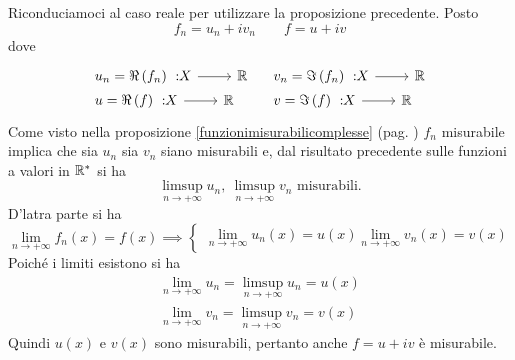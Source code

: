 \begin{demonstration}
	Riconduciamoci al caso reale per utilizzare la proposizione precedente. Posto
	\begin{equation*}
		f_n=u_n+iv_n\qquad f=u+iv
	\end{equation*}
dove
\begin{equation*}
	\begin{array}{ll}
		\funz{u_n=\Re\left(f_n\right)}{X}{\realset}&\funz{v_n=\Im\left(f_n\right)}{X}{\realset}\\
		\funz{u=\Re\left(f\right)}{X}{\realset}&\funz{v=\Im\left(f\right)}{X}{\realset}
	\end{array}
\end{equation*}
Come visto nella proposizione \ref{funzionimisurabilicomplesse} (pag. \pageref{funzionimisurabilicomplesse}) $f_n$ misurabile implica che sia $u_n$ sia $v_n$ siano misurabili e, dal risultato precedente sulle funzioni a valori in $\mathbb{R}^{\ast}$ si ha
\begin{equation*}
	\limsup_{n\to+\infty}u_n,\ \limsup_{n\to+\infty}v_n\text{ misurabili.}
\end{equation*}
D'latra parte si ha
\begin{equation*}
	\lim_{n\to+\infty}f_n\left(x\right)=f\left(x\right)\implies
	\begin{cases}
		\lim_{n\to+\infty}u_n\left(x\right)=u\left(x\right)
		\lim_{n\to+\infty}v_n\left(x\right)=v\left(x\right)
	\end{cases}
\end{equation*}
Poiché i limiti esistono si ha
\begin{gather*}
	\lim_{n\to+\infty}u_n=\limsup_{n\to+\infty}u_n=u\left(x\right)\\	\lim_{n\to+\infty}v_n=\limsup_{n\to+\infty}v_n=v\left(x\right)
\end{gather*}
Quindi $u\left(x\right)$ e $v\left(x\right)$ sono misurabili, pertanto anche $f=u+iv$ è misurabile.
\end{demonstration}
